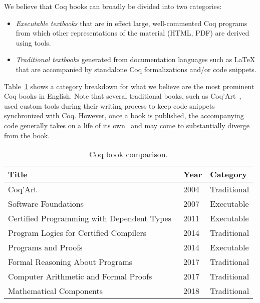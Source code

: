 \documentclass{easychair}
\begin{document}
We believe that Coq books can broadly be divided into two categories:
\begin{itemize}
\item \emph{Executable textbooks} that are in effect large, well-commented Coq programs from which other representations of the material (HTML, PDF) are derived using tools.
\item \emph{Traditional textbooks} generated from documentation languages such as LaTeX that are accompanied by standalone Coq formalizations and/or code snippets.
\end{itemize}
Table~\ref{tbl:books} shows a category breakdown for what we believe are the most prominent Coq books in English. Note that several traditional books, such as Coq'Art~\cite{BC04}, used custom tools during their writing process to keep code snippets synchronized with Coq. However, once a book is published, the accompanying code generally takes on a life of its own~\cite{CoqArtCommunity} and may come to substantially diverge from the book.

\begin{table}
  \centering
  \footnotesize
  \begin{tabular}{lll}
  \hline
  \textbf{Title} & \textbf{Year} & \textbf{Category}\\
  \hline
  Coq'Art~\cite{BC04} & 2004 & Traditional\\
  Software Foundations~\cite{SF} & 2007 & Executable\\
  Certified Programming with Dependent Types~\cite{chlipalacpdt2011} & 2011 &  Executable\\
  Program Logics for Certified Compilers~\cite{Appel2014} & 2014 & Traditional\\
  Programs and Proofs~\cite{Sergey:PnP} & 2014 & Executable\\
  Formal Reasoning About Programs~\cite{Chlipala2017} & 2017 & Traditional\\
  Computer Arithmetic and Formal Proofs~\cite{Boldo2017} & 2017 & Traditional\\
  Mathematical Components~\cite{MCB} & 2018 & Traditional\\
  \hline
  \end{tabular}
  \caption{Coq book comparison.}
  \label{tbl:books}
\end{table}
\end{document}
